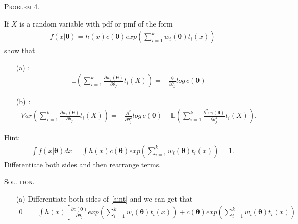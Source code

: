 \documentclass{article}
\begin{document}
\begin{CJK}{UTF8}{gbsn}
    \begin{shaded}
        \noindent\textsc{Problem 4.}\par
        If $X$ is a random variable with pdf or pmf of the form
        \begin{align}
            f(x|\boldsymbol{\theta}) = h(x)c(\boldsymbol{\theta})exp\left ( \sum_{i=1}^k w_i(\boldsymbol{\theta})t_i(x)\right )
        \end{align}
        show that
        \begin{itemize}
            \item [(a)]:
                  \begin{align}
                      \mathbb{E}\left (\sum_{i=1}^k \frac{\partial w_i(\boldsymbol{\theta})}{\partial \theta_j}t_i(X) \right ) = -\frac{\partial}{\partial \theta_j}log\, c(\boldsymbol{\theta})\label{a}
                  \end{align}
            \item [(b)]:
                  \begin{align}
                      Var\left (\mathop{\sum}_{i=1}^k \frac{\partial w_i(\boldsymbol{\theta})}{\partial \theta_j }t_i(X) \right )
                      = -\frac{\partial^2}{\partial \theta_j^2}log\, c(\boldsymbol{\theta}) - \mathbb{E}\left (\sum_{i=1}^k \frac{\partial^2 w_i(\boldsymbol{\theta})}{\partial \theta_j^2} t_i(X) \right ).\label{b}
                  \end{align}
        \end{itemize}
        Hint:
        \begin{align}
            \int f(x|\boldsymbol{\theta}) dx = \int h(x)c(\boldsymbol{\theta})
            exp\left (\sum_{i=1}^k w_i(\boldsymbol{\theta})t_i(x) \right ) =1.\label{hint}
        \end{align}
        Differentiate both sides and then rearrange terms.
    \end{shaded}
    \noindent\textsc{Solution.}\par
    \begin{itemize}
        \item [(a)] Differentiate both sides of \eqref{hint} and we can get that
              \begin{align}
                  0 & = \int h(x) \left [\frac{\partial c(\boldsymbol{\theta})}{\partial \theta_j}
                      exp\left (\sum_{i=1}^kw_i(\boldsymbol{\theta})t_i(x) \right ) +
                      c(\boldsymbol{\theta})exp\left (\sum_{i=1}^kw_i(\boldsymbol{\theta})t_i(x) \right )

\end{align}
\end{itemize}
\end{CJK}
\end{document}
